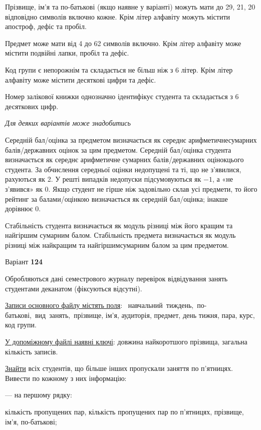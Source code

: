 \documentclass[11pt, ukrainian]{article}
\begin{document}
Прізвище, ім’я та по-батькові (якщо наявне у варіанті) можуть мати до 29, 21, 20 відповідно символів включно кожне. 
Крім літер алфавіту можуть містити апостроф, дефіс та пробіл.

Предмет може мати від 4 до 62 символів включно. 
Крім літер алфавіту може містити подвійні лапки, пробіл та дефіс.

Код групи є непорожнім та складається не більш ніж з 6 літер. 
Крім літер алфавіту може містити десяткові цифри та дефіс.


Номер залікової книжки однозначно ідентифікує студента та складається з 6 десяткових цифр. 

\bigskip\textit{Для деяких варіантів може знадобитись}

Середній бал/оцінка за предметом визначається як середнє арифметичнесумарних балів/державних оцінок за цим предметом. 
Середній бал/оцінка студента визначається як середнє арифметичне сумарних балів/державних оцінокцього студента. 
За обчислення середньої оцінки недопущені та ті, що не з’явилися, рахуються як 2.
У решті випадків недопуски підсумовуються як $-1$, а «не з’явився» як 0.
Якщо студент не гірше ніж задовільно склав усі предмети, 
то його рейтинг за балами/оцінкою визначається як середній бал/оцінка; інакше дорівнює 0.

Стабільність студента визначається як модуль різниці між його кращим та найгіршим сумарним балом.
Стабільність предмета визначається як модуль різниці між найкращим та найгіршимсумарним балом за цим предметом.






\par
\newpage
{\center Варіант  \No \textbf { 124 }\par}
\bigskip
Обробляються дані семестрового журналу перевірок відвідування занять студентами деканатом (фіксуються відсутні). 

\underline{Записи основного файлу містять поля}: \ навчальний\ тиждень,\ по-батькові,\ вид\ занять,\ прізвище, ім’я, аудиторія, предмет, день тижня, пара, курс, код групи.

\underline{У допоміжному файлі наявні ключі}: довжина найкоротшого прізвища, загальна кількість записів.

\underline{Знайти} всіх студентів, що більше інших пропускали заняття по п’ятницях. Вивести по кожному з них інформацію:\par
{\noindent}--- на першому рядку:\par
кількість пропущених пар, кількість пропущених пар по п’ятницях, прізвище, ім’я, по-батькові;
\end{document}
